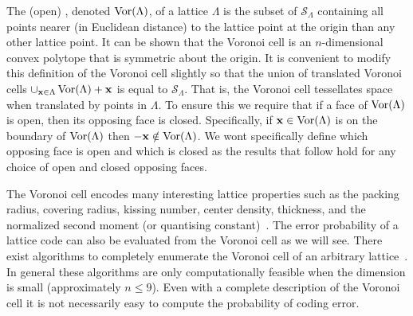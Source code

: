 \documentclass[draftcls, onecolumn, 11pt]{IEEEtran}
\begin{document}
The (open) , denoted $\operatorname{Vor}(\Lambda)$, of a lattice $\Lambda$ is the subset of $\mathcal{S}_{\Lambda}$ containing all points nearer (in Euclidean distance) to the lattice point at the origin than any other lattice point. It can be shown that the Voronoi cell is an $n$-dimensional convex polytope that is symmetric about the origin.  It is convenient to modify this definition of the Voronoi cell slightly so that the union of translated Voronoi cells $\cup_{\mathbf{x} \in \Lambda}\operatorname{Vor}(\Lambda) + \mathbf{x}$ is equal to  $\mathcal{S}_{\Lambda}$.  That is, the Voronoi cell tessellates space when translated by points in $\Lambda$.  To ensure this we require that if a face of $\operatorname{Vor}(\Lambda)$ is open, then its opposing face is closed. Specifically, if $\mathbf{x} \in \operatorname{Vor}(\Lambda)$ is on the boundary of $\operatorname{Vor}(\Lambda)$ then $-\mathbf{x} \notin \operatorname{Vor}(\Lambda)$.  We wont specifically define which opposing face is open and which is closed as the results that follow hold for any choice of open and closed opposing faces.

The Voronoi cell encodes many interesting lattice properties such as the packing radius, covering radius, kissing number, center density, thickness, and the normalized second moment (or quantising constant)~\cite{Viterbo_diamond_cutting_1996, SPLAG}. The error probability of a lattice code can also be evaluated from the Voronoi cell as we will see.  There exist algorithms to completely enumerate the Voronoi cell of an arbitrary lattice~\cite{Viterbo_diamond_cutting_1996,Sikiric_complex_algs_vor_cells_2009,Sikiric_vor_reduction_covering_2008,Valentin2003_coverings_tilings_low_dimension}.  In general these algorithms are only computationally feasible when the dimension is small (approximately $n \leq 9$).  Even with a complete description of the Voronoi cell it is not necessarily easy to compute the probability of coding error.
\end{document}
